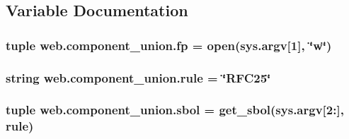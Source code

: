 \subsection{Variable Documentation}
\hypertarget{namespaceweb_1_1component__union_a9642c72545ebbae7984a6dab04d32be0}{
\subsubsection[{fp}]{\setlength{\rightskip}{0pt plus 5cm}tuple web.\-component\-\_\-union.\-fp = open(sys.\-argv\mbox{[}1\mbox{]}, \char`\"{}w\char`\"{})}}\label{namespaceweb_1_1component__union_a9642c72545ebbae7984a6dab04d32be0}
\hypertarget{namespaceweb_1_1component__union_a09dd22f423bf9b8b35c70dcd05010e4f}{
\subsubsection[{rule}]{\setlength{\rightskip}{0pt plus 5cm}string web.\-component\-\_\-union.\-rule = \char`\"{}R\-F\-C25\char`\"{}}}\label{namespaceweb_1_1component__union_a09dd22f423bf9b8b35c70dcd05010e4f}
\hypertarget{namespaceweb_1_1component__union_a1c39ec4e56348057924a5e34290eb87c}{
\subsubsection[{sbol}]{\setlength{\rightskip}{0pt plus 5cm}tuple web.\-component\-\_\-union.\-sbol = {\bf get\-\_\-sbol}(sys.\-argv\mbox{[}2\-:\mbox{]}, {\bf rule})}}\label{namespaceweb_1_1component__union_a1c39ec4e56348057924a5e34290eb87c}
